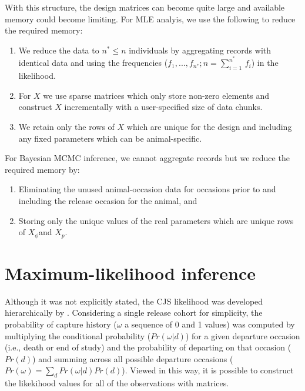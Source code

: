 \documentclass[12pt]{article}
\begin{document}
With this structure, the design matrices can become quite large and
available memory could become limiting. For MLE analyis, we use the
following to reduce the required memory:
\begin{enumerate}
\item We reduce the data to $n^{*}\leq n$ individuals by aggregating records
with identical data and using the frequencies ($f_{1},...,f_{n^{*}};n=\sum_{i=1\:}^{n^{*}}f_{i}$)
in the likelihood. 
\item For $X$ we use sparse matrices which only store non-zero elements
and construct $X$ incrementally with a user-specified size of data
chunks.
\item We retain only the rows of $X$ which are unique for the design and
including any fixed parameters which can be animal-specific. 
\end{enumerate}
For Bayesian MCMC inference, we cannot aggregate records but we reduce
the required memory by:
\begin{enumerate}
\item Eliminating the unused animal-occasion data for occasions prior to
and including the release occasion for the animal, and
\item Storing only the unique values of the real parameters which are unique
rows of $X_{\phi}$and $X_{p}$.
\end{enumerate}

\section*{Maximum-likelihood inference}

Although it was not explicitly stated, the CJS likelihood was developed
hierarchically by \citet{Pledger2003}. Considering a single release
cohort for simplicity, the probability of capture history ($\omega$
a sequence of 0 and 1 values) was computed by multiplying the conditional
probability ($Pr(\omega|d)$) for a given departure occasion (i.e.,
death or end of study) and the probability of departing on that occasion
($Pr(d)$) and summing across all possible departure occasions ($Pr(\omega)=\sum_{d}Pr(\omega|d)Pr(d)$).
Viewed in this way, it is possible to construct the likekihood values
for all of the observations with matrices. 
\end{document}
